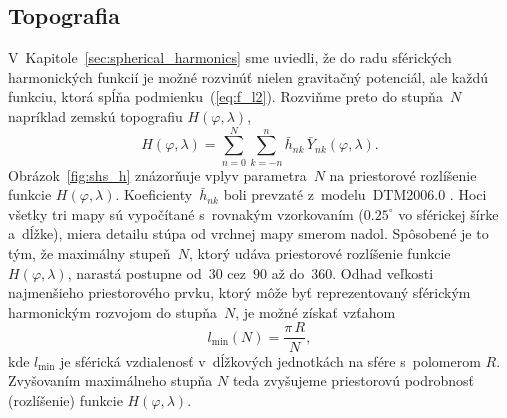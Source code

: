 \documentclass[a4paper, 12pt]{book}
\begin{document}
\subsection{Topografia}
\label{sec:sh_applications_topography}

V~Kapitole~\ref{sec:spherical_harmonics} sme uviedli, že do radu sférických
harmonických funkcií je možné rozvinúť nielen gravitačný potenciál, ale každú
funkciu, ktorá spĺňa podmienku~(\ref{eq:f_l2}).  Rozviňme preto do stupňa~$N$ 
napríklad zemskú topografiu $H(\varphi, \lambda)$,
%
\begin{equation}
\label{eq:h_shs}
H(\varphi, \lambda) = \sum_{n = 0}^{N} \sum_{k = -n}^n \bar{h}_{nk} \,
\bar{Y}_{nk}(\varphi, \lambda){.}
\end{equation}
%
Obrázok~\ref{fig:shs_h} znázorňuje vplyv parametra~$N$ na priestorové 
rozlíšenie funkcie $H(\varphi, \lambda)$.  Koeficienty~$\bar{h}_{nk}$ boli 
prevzaté z~modelu~DTM2006.0 \parencite{DTM2006}.  Hoci všetky tri mapy sú 
vypočítané s~rovnakým vzorkovaním ($0.25^{\circ}$ vo sférickej šírke a~dĺžke), 
miera detailu stúpa od vrchnej mapy smerom nadol.  Spôsobené je to tým, že 
maximálny stupeň~$N$, ktorý udáva priestorové rozlíšenie funkcie 
$H(\varphi,\lambda)$, narastá postupne od~$30$ cez~$90$ až do~$360$.  Odhad 
veľkosti najmenšieho priestorového prvku, ktorý môže byť reprezentovaný 
sférickým harmonickým rozvojom do stupňa~$N$, je možné získať vzťahom 
\parencite{Barthelmes2013}
%
\begin{equation}
l_{\min}(N) = \frac{\pi \, R}{N}{,}
\end{equation}
%
kde $l_{\min}$ je sférická vzdialenosť v~dĺžkových jednotkách na sfére 
s~polomerom $R$.  Zvyšovaním maximálneho stupňa $N$ teda zvyšujeme priestorovú 
podrobnosť (rozlíšenie) funkcie $H(\varphi, \lambda)$.
\end{document}
